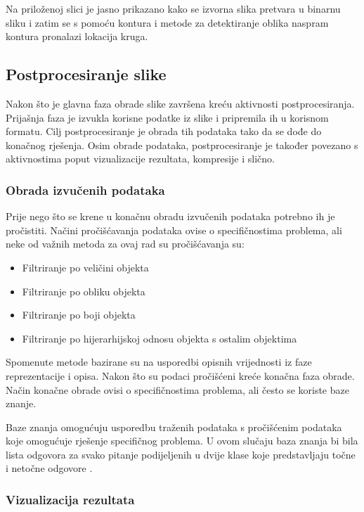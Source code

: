 \documentclass{foi}
\begin{document}
Na priloženoj slici je jasno prikazano kako se izvorna slika pretvara u binarnu sliku i zatim se s pomoću kontura i metode za detektiranje oblika naspram kontura pronalazi lokacija kruga.

\subsection{Postprocesiranje slike}

Nakon što je glavna faza obrade slike završena kreću aktivnosti postprocesiranja. Prijašnja faza je izvukla korisne podatke iz slike i pripremila ih u korisnom formatu. Cilj postprocesiranje je obrada tih podataka tako da se dođe do konačnog rješenja. Osim obrade podataka, postprocesiranje je također povezano s aktivnostima poput vizualizacije rezultata, kompresije i slično.

\subsubsection{Obrada izvučenih podataka}

\begin{flushleft}
    Prije nego što se krene u konačnu obradu izvučenih podataka potrebno ih je pročistiti. Načini pročišćavanja podataka ovise o specifičnostima problema, ali neke od važnih metoda za ovaj rad su pročišćavanja su:
\begin{itemize}
    \item Filtriranje po veličini objekta
    \item Filtriranje po obliku objekta
    \item Filtriranje po boji objekta
    \item Filtriranje po hijerarhijskoj odnosu objekta s ostalim objektima
\end{itemize}
\end{flushleft}

Spomenute metode bazirane su na usporedbi opisnih vrijednosti iz faze reprezentacije i opisa. Nakon što su podaci pročišćeni kreće konačna faza obrade. Način konačne obrade ovisi o specifičnostima problema, ali često se koriste baze znanje.

Baze znanja omogućuju usporedbu traženih podataka s pročišćenim podataka koje omogućuje rješenje specifičnog problema. U ovom slučaju baza znanja bi bila lista odgovora za svako pitanje podijeljenih u dvije klase koje predstavljaju točne i netočne odgovore \cite{ImageProcessing}. 

\subsubsection{Vizualizacija rezultata}
\end{document}
